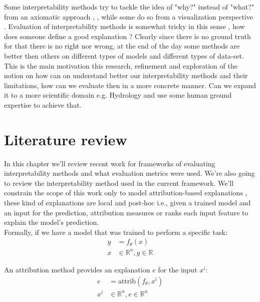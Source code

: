 \documentclass[12pt]{report}
\begin{document}
Some interpretability methods try to tackle the idea of "why?" instead of "what?" from an axiomatic approach 
\cite{DBLP:journals/corr/SundararajanTY17}, \cite{DBLP:journals/corr/abs-2111-07668},  while some do so
from a visualization perspective \cite{DBLP:journals/corr/abs-1802-00614}. Evaluation of interpretability methods is somewhat tricky in this sense , how does someone define a good explanation ? Clearly since there is no ground truth for that there is no right nor wrong, at the end of the day some methods are better then others on different types of models and different types of data-set. \\ 

This is the main motivation this research,  refinement and exploration of the notion on how can on understand better our interpretability methods and their limitations, how can we evaluate then in a more concrete manner. Can we expand it to a more scientific domain e.g. Hydrology and use some human ground expertise to achieve that. 


\newpage

\chapter{Literature review} 

In this chapter we'll review recent work for frameworks of evaluating interpretability methods and what evaluation metrics were used. We're also going to review the interpretability method used in the current framework. We'll constrain the scope of this work only to model attribution-based explanations \cite{electronics10050593}, these kind of explanations are local and post-hoc i.e., given a trained model and an input for the prediction, attribution measures or ranks each input feature to explain the model's prediction. \\

Formally, if we have a model that was trained to perform a specific task:
\begin{align*}
	y & = f_{\theta}(x) \\
	x & \in \mathbb{R}^n, y \in \mathbb{R}
\end{align*}

An attribution method provides an explanation $e$ for the input $x^i$:
\begin{align*}
	e &= \text{attrib}(f_{\theta}, x^i) \\
	x^i & \in \mathbb{R}^n, e \in \mathbb{R}^n
\end{align*}
\end{document}
